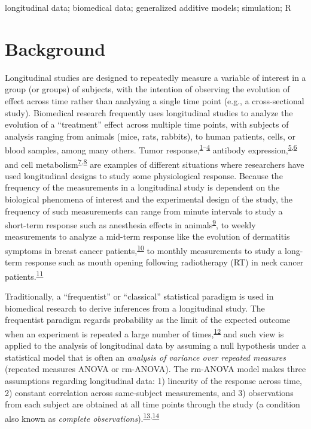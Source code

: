 \documentclass[
]{article}
\begin{document}
longitudinal data; biomedical data; generalized additive models; simulation; R

\hypertarget{background}{%
\section{Background}\label{background}}

Longitudinal studies are designed to repeatedly measure a variable of interest in a group (or groups) of subjects, with the intention of observing the evolution of effect across time rather than analyzing a single time point (e.g., a cross-sectional study). Biomedical research frequently uses longitudinal studies to analyze the evolution of a ``treatment'' effect across multiple time points, with subjects of analysis ranging from animals (mice, rats, rabbits), to human patients, cells, or blood samples, among many others. Tumor response,\textsuperscript{\protect\hyperlink{ref-roblyer2011}{1}--\protect\hyperlink{ref-demidov2018}{4}} antibody expression,\textsuperscript{\protect\hyperlink{ref-ritter2001}{5},\protect\hyperlink{ref-roth2017}{6}} and cell metabolism\textsuperscript{\protect\hyperlink{ref-jones2018}{7},\protect\hyperlink{ref-skala2010}{8}} are examples of different situations where researchers have used longitudinal designs to study some physiological response. Because the frequency of the measurements in a longitudinal study is dependent on the biological phenomena of interest and the experimental design of the study, the frequency of such measurements can range from minute intervals to study a short-term response such as anesthesia effects in animals\textsuperscript{\protect\hyperlink{ref-greening2018}{9}}, to weekly measurements to analyze a mid-term response like the evolution of dermatitis symptoms in breast cancer patients,\textsuperscript{\protect\hyperlink{ref-sio2016}{10}} to monthly measurements to study a long-term response such as mouth opening following radiotherapy (RT) in neck cancer patients.\textsuperscript{\protect\hyperlink{ref-kamstra2015}{11}}

Traditionally, a ``frequentist'' or ``classical'' statistical paradigm is used in biomedical research to derive inferences from a longitudinal study. The frequentist paradigm regards probability as the limit of the expected outcome when an experiment is repeated a large number of times,\textsuperscript{\protect\hyperlink{ref-wagenmakers2008}{12}} and such view is applied to the analysis of longitudinal data by assuming a null hypothesis under a statistical model that is often an \emph{analysis of variance over repeated measures} (repeated measures ANOVA or rm-ANOVA). The rm-ANOVA model makes three assumptions regarding longitudinal data: 1) linearity of the response across time, 2) constant correlation across same-subject measurements, and 3) observations from each subject are obtained at all time points through the study (a condition also known as \emph{complete observations}).\textsuperscript{\protect\hyperlink{ref-gueorguieva2004}{13},\protect\hyperlink{ref-schober2018}{14}}
\end{document}
